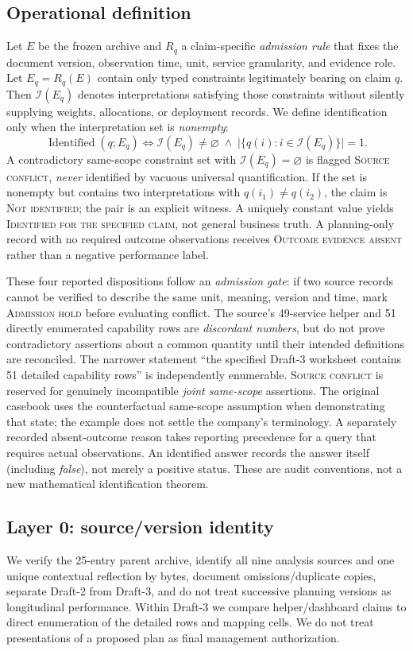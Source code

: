\documentclass[systems,article,submit,moreauthors]{Definitions/mdpi}
\begin{document}
\subsection{Operational definition}
Let $E$ be the frozen archive and $R_q$ a claim-specific \emph{admission rule} that fixes the document version, observation time, unit, service granularity, and evidence role. Let $E_q=R_q(E)$ contain only typed constraints legitimately bearing on claim $q$. Then $\mathcal{I}(E_q)$ denotes interpretations satisfying those constraints without silently supplying weights, allocations, or deployment records. We define identification only when the interpretation set is \emph{nonempty}:
\[
\operatorname{Identified}(q;E_q)\iff\mathcal{I}(E_q)\neq\varnothing\;\land\;\bigl|\{q(i):i\in\mathcal{I}(E_q)\}\bigr|=1.
\]
A contradictory same-scope constraint set with $\mathcal{I}(E_q)=\varnothing$ is flagged \textsc{Source conflict}, \emph{never} identified by vacuous universal quantification. If the set is nonempty but contains two interpretations with $q(i_1)\ne q(i_2)$, the claim is \textsc{Not identified}; the pair is an explicit witness. A uniquely constant value yields \textsc{Identified for the specified claim}, not general business truth. A planning-only record with no required outcome observations receives \textsc{Outcome evidence absent} rather than a negative performance label.

These four reported dispositions follow an \emph{admission gate}: if two source records cannot be verified to describe the same unit, meaning, version and time, mark \textsc{Admission hold} before evaluating conflict. The source's 49-service helper and 51 directly enumerated capability rows are \emph{discordant numbers}, but do not prove contradictory assertions about a common quantity until their intended definitions are reconciled. The narrower statement ``the specified Draft-3 worksheet contains 51 detailed capability rows'' is independently enumerable. \textsc{Source conflict} is reserved for genuinely incompatible \emph{joint same-scope} assertions. The original casebook uses the counterfactual same-scope assumption when demonstrating that state; the example does not settle the company's terminology. A separately recorded absent-outcome reason takes reporting precedence for a query that requires actual observations. An identified answer records the answer itself (including \emph{false}), not merely a positive status. These are audit conventions, not a new mathematical identification theorem.

\subsection{Layer 0: source/version identity}
We verify the 25-entry parent archive, identify all nine analysis sources and one unique contextual reflection by bytes, document omissions/duplicate copies, separate Draft-2 from Draft-3, and do not treat successive planning versions as longitudinal performance. Within Draft-3 we compare helper/dashboard claims to direct enumeration of the detailed rows and mapping cells. We do not treat presentations of a proposed plan as final management authorization.
\end{document}

